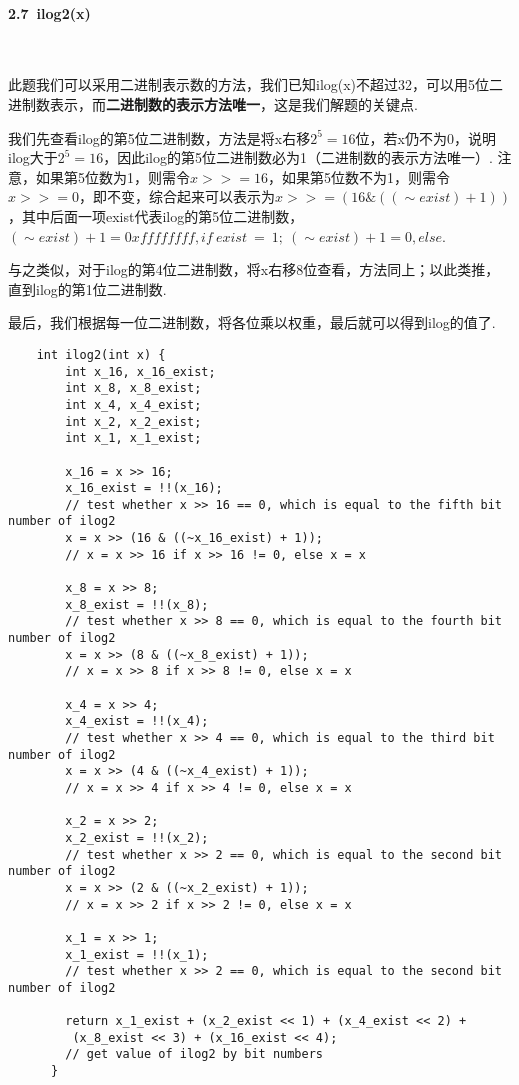 \documentclass[UTF8]{ctexart}
\begin{document}
\paragraph*{2.7\ ilog2(x)}\ \par
此题我们可以采用二进制表示数的方法，我们已知ilog(x)不超过32，可以用5位二进制数表示，而\textbf{二进制数的表示方法唯一}，这是我们解题的关键点.\par
我们先查看ilog的第5位二进制数，方法是将x右移$2^5=16$位，若x仍不为0，说明ilog大于$2^5=16$，因此ilog的第5位二进制数必为1（二进制数的表示方法唯一）. 注意，如果第5位数为1，则需令$x >>= 16$，如果第5位数不为1，则需令$x >>= 0$，即不变，综合起来可以表示为$x >>= (16 \& ((\sim exist) + 1))$，其中后面一项exist代表ilog的第5位二进制数，$(\sim exist) + 1=0xffffffff, if\ exist\ =\ 1;\ (\sim exist) + 1=0, else$.\par
与之类似，对于ilog的第4位二进制数，将x右移8位查看，方法同上；以此类推，直到ilog的第1位二进制数.\par
最后，我们根据每一位二进制数，将各位乘以权重，最后就可以得到ilog的值了.
\begin{lstlisting}
    int ilog2(int x) {
        int x_16, x_16_exist;
        int x_8, x_8_exist;
        int x_4, x_4_exist;
        int x_2, x_2_exist;
        int x_1, x_1_exist;
      
        x_16 = x >> 16;
        x_16_exist = !!(x_16);
        // test whether x >> 16 == 0, which is equal to the fifth bit number of ilog2 
        x = x >> (16 & ((~x_16_exist) + 1));
        // x = x >> 16 if x >> 16 != 0, else x = x
        
        x_8 = x >> 8;
        x_8_exist = !!(x_8);
        // test whether x >> 8 == 0, which is equal to the fourth bit number of ilog2 
        x = x >> (8 & ((~x_8_exist) + 1));
        // x = x >> 8 if x >> 8 != 0, else x = x
      
        x_4 = x >> 4;
        x_4_exist = !!(x_4);
        // test whether x >> 4 == 0, which is equal to the third bit number of ilog2 
        x = x >> (4 & ((~x_4_exist) + 1));
        // x = x >> 4 if x >> 4 != 0, else x = x
      
        x_2 = x >> 2;
        x_2_exist = !!(x_2);
        // test whether x >> 2 == 0, which is equal to the second bit number of ilog2 
        x = x >> (2 & ((~x_2_exist) + 1));
        // x = x >> 2 if x >> 2 != 0, else x = x
      
        x_1 = x >> 1;
        x_1_exist = !!(x_1);
        // test whether x >> 2 == 0, which is equal to the second bit number of ilog2 
      
        return x_1_exist + (x_2_exist << 1) + (x_4_exist << 2) +
         (x_8_exist << 3) + (x_16_exist << 4);
        // get value of ilog2 by bit numbers
      }
\end{lstlisting}
\end{document}
